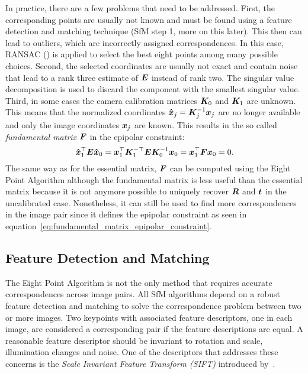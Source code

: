 			In practice, there are a few problems that need to be addressed.
			First, the corresponding points are usually not known and must be found using a feature detection and matching technique (SfM step 1, more on this later).
			This then can lead to outliers, which are incorrectly assigned correspondences.
			In this case, {RANSAC} (\cite{fischler1981random}) is applied to select the best eight points among many possible choices.
			Second, the selected coordinates are usually not exact and contain noise that lead to a rank three estimate of $\bm{E}$ instead of rank two.
			The singular value decomposition is used to discard the component with the smallest singular value.
			Third, in some cases the camera calibration matrices $\bm{K}_0$ and $\bm{K}_1$ are unknown.
			This means that the normalized coordinates $\bm{\hat{x}}_j = \bm{K}_j^{-1} \bm{x}_j$ are no longer available and only the image coordinates $\bm{x}_j$ are known.
			This results in the so called \emph{fundamental matrix} $\bm{F}$ in the epipolar constraint:
			\begin{equation}\label{eq:fundamental_matrix_epipolar_constraint}
				\bm{\hat{x}}_1^\top \bm{E} \bm{\hat{x}}_0 = 
				\bm{x}_1^\top \bm{K}_1^{-\top} \bm{E} \bm{K}_0^{-1} \bm{x}_0 = 
				\bm{x}_1^\top \bm{F} \bm{x}_0 = 0.
			\end{equation}
			The same way as for the essential matrix, $\bm{F}$ can be computed using the Eight Point Algorithm although the fundamental matrix is less useful than the essential matrix because it is not anymore possible to uniquely recover $\bm{R}$ and $\bm{t}$ in the uncalibrated case.
			Nonetheless, it can still be used to find more correspondences in the image pair since it defines the epipolar constraint as seen in equation~\ref{eq:fundamental_matrix_epipolar_constraint}.
			
		\subsection{Feature Detection and Matching}
			The Eight Point Algorithm is not the only method that requires accurate correspondences across image pairs.
			All SfM algorithms depend on a robust feature detection and matching to solve the correspondence problem between two or more images.
			Two keypoints with associated feature descriptors, one in each image, are considered a corresponding pair if the feature descriptions are equal.
			A reasonable feature descriptor should be invariant to rotation and scale, illumination changes and noise.
			One of the descriptors that addresses these concerns is the \emph{Scale Invariant Feature Transform (SIFT)} introduced by~\cite{lowe1999object}.
			
